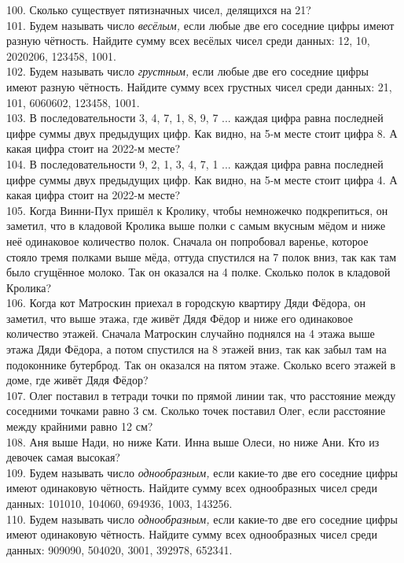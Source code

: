100. Сколько существует пятизначных чисел, делящихся на 21?\\
101. Будем называть число {\it весёлым,} если любые две его соседние цифры имеют разную чётность. Найдите сумму всех весёлых чисел среди данных: 12, 10, 2020206, 123458, 1001.\\
102. Будем называть число {\it грустным,} если любые две его соседние цифры имеют разную чётность. Найдите сумму всех грустных чисел среди данных: 21, 101, 6060602, 123458, 1001.\\
103. В последовательности 3, 4, 7, 1, 8, 9, 7 ... каждая цифра равна последней цифре суммы двух предыдущих цифр. Как видно, на 5-м месте стоит цифра 8. А какая цифра стоит на 2022-м месте?\\
104. В последовательности 9, 2, 1, 3, 4, 7, 1 ... каждая цифра равна последней цифре суммы двух предыдущих цифр. Как видно, на 5-м месте стоит цифра 4. А какая цифра стоит на 2022-м месте?\\
105. Когда Винни-Пух пришёл к Кролику, чтобы немножечко подкрепиться, он заметил, что в кладовой Кролика выше полки с самым вкусным мёдом и ниже неё одинаковое количество полок. Сначала он попробовал варенье, которое стояло тремя полками выше мёда, оттуда спустился на 7 полок вниз, так как там было сгущённое молоко. Так он оказался на 4 полке. Сколько полок в кладовой Кролика?\\
106. Когда кот Матроскин приехал в городскую квартиру Дяди Фёдора, он заметил, что выше этажа, где живёт Дядя Фёдор и ниже его одинаковое количество этажей. Сначала Матроскин случайно поднялся на 4 этажа выше этажа Дяди Фёдора, а потом спустился на 8 этажей вниз, так как забыл там на подоконнике бутерброд. Так он оказался на пятом этаже. Сколько всего этажей в доме, где живёт Дядя Фёдор?\\
107. Олег поставил в тетради точки по прямой линии так, что расстояние между соседними точками равно 3 см. Сколько точек поставил Олег, если расстояние между крайними равно 12 см?\\
108. Аня выше Нади, но ниже Кати. Инна выше Олеси, но ниже Ани. Кто из девочек самая высокая?\\
109. Будем называть число {\it однообразным,} если какие-то две его соседние цифры имеют одинаковую чётность. Найдите сумму всех однообразных чисел среди данных: 101010, 104060, 694936, 1003, 143256.\\
110. Будем называть число {\it однообразным,} если какие-то две его соседние цифры имеют одинаковую чётность. Найдите сумму всех однообразных чисел среди данных: 909090, 504020, 3001, 392978, 652341.\\
